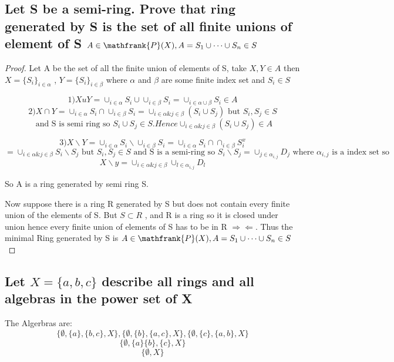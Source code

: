 \documentclass[paper=letter, fontsize=11pt]{scrartcl} %
\begin{document}
\subsection{ Let S be a semi-ring. Prove that ring generated by S is the set of all finite unions of element of S ${A \in \mathfrank{P}(X) , A=S_1\cup \dots \cup S_n \in S}$}
\begin{proof}

Let A be the set of all the finite union of elements of S, take $X,Y \in A$ then $X=\{S_i\}_{i \in \alpha}$ , $Y=\{S_i\}_{i \in \beta}$ where $\alpha$ and $\beta$ are some finite index set and $S_i \in S$    
\begin{center}
 $$ 1)  XuY=\cup_{i \in \alpha} S_i  \cup \cup_{i \in \beta} S_i = \cup _{i \in \alpha \cup \beta} S_i \in A$$
   $$ 2) X\cap Y= \cup_{i \in \alpha} S_i  \cap \cup_{i \in \beta} S_i= \cup_{i \in \alpha \& j \in \beta} (S_i \cup S_j) 
    \text{ but } S_i,S_j \in S $$  $$\text{ and S is semi ring so } S_i \cup S_j \in S. Hence
    \cup_{i \in \alpha \& j \in \beta} (S_i \cup S_j) \in A   $$
     
    $$3) X \backslash Y= \cup_{i \in \alpha} S_i  \backslash \cup_{i \in \beta} S_i= \cup_{i \in \alpha} S_i  \cap  \cap_{i \in \beta} S_i^x$$
    $$=\cup_{i \in \alpha \& j \in \beta} S_i \backslash S_j \text{ but } S_i,S_j \in S \text{ and S is a semi-ring  so } S_i \backslash S_j = \cup_{j \in \alpha_{i,j}} D_j \text{ where } \alpha_{i,j} \text{ is a index set so} $$
   $$ X\backslash y=\cup_{i \in \alpha \& j \in \beta} \cup_{l \in \alpha_{i,j}} D_l$$

\end{center}
So A is a ring generated by semi ring S.

Now suppose there is a ring R generated by S but does not contain every finite union of the elements of S. But $S \subset R$ , and R is a ring so it is closed under union hence every finite union of elements of S has to be in R $\Rightarrow\!\Leftarrow$. Thus the minimal Ring generated by S is ${A \in \mathfrank{P}(X) , A=S_1\cup \dots \cup S_n \in S}$ 
\end{proof}

\subsection{ Let $X=\{a,b,c\}$ describe all rings and all algebras in the power set of X}
The Algerbras are:\\
$$\{ \emptyset, \{a\},\{b,c\},X\}, \{ \emptyset ,\{b\},\{a,c\},X\},\{\emptyset,\{c\},\{a,b\},X\}$$
$$\{\emptyset,\{a\}\{b\},\{c\},X\}$$
$$\{\emptyset,X\}$$
\end{document}
